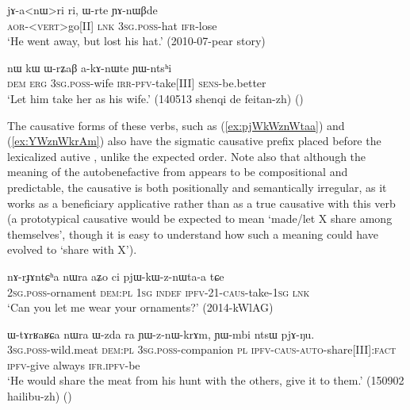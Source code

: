 \begin{exe}
\ex \label{ex:Wrte.YAnWBde2}
\gll jɤ-a<nɯ>ri ri, ɯ-rte ɲɤ-nɯβde \\
\textsc{aor}-<\textsc{vert}>go[II] \textsc{lnk} \textsc{3sg}.\textsc{poss}-hat \textsc{ifr}-lose\\
\glt `He went away, but lost his hat.' (2010-07-pear story)
\end{exe}

\begin{exe}
\ex \label{ex:WrZaB.akAnWte}
\gll nɯ kɯ ɯ-rʑaβ a-kɤ-nɯte ɲɯ-ntsʰi \\
\textsc{dem} \textsc{erg} \textsc{3sg}.\textsc{poss}-wife \textsc{irr}-\textsc{pfv}-take[III] \textsc{sens}-be.better \\
\glt `Let him take her as his wife.' (140513 shenqi de feitan-zh) ()
\end{exe}

The causative forms of these  verbs, such as   (\ref{ex:pjWkWznWtaa}) and  (\ref{ex:YWznWkrAm}) also have the sigmatic causative prefix placed before the lexicalized autive , unlike the expected order.  Note also that although the meaning of the autobenefactive  from    appears to be compositional and predictable, the causative is both positionally and semantically irregular, as it works as a beneficiary applicative rather than as a true causative with this verb (a prototypical causative would be expected to mean `made/let X share among themselves', though it is easy to understand how such a meaning could have evolved to `share with X').

\begin{exe}
\ex \label{ex:pjWkWznWtaa}
\gll nɤ-rɟɤntɕʰa nɯra aʑo ci pjɯ-kɯ-z-nɯta-a tɕe \\
\textsc{2sg}.\textsc{poss}-ornament \textsc{dem}:\textsc{pl} \textsc{1sg} \textsc{indef} \textsc{ipfv}-2\fl{}1-\textsc{caus}-take-\textsc{1sg} \textsc{lnk} \\
\glt `Can you let me wear your ornaments?' (2014-kWlAG)
\end{exe}

\begin{exe}
\ex \label{ex:YWznWkrAm}
\gll ɯ-tɤrʁaʁɕa nɯra ɯ-zda ra ɲɯ-z-nɯ-krɤm, ɲɯ-mbi ntsɯ pjɤ-ŋu. \\
\textsc{3sg}.\textsc{poss}-wild.meat \textsc{dem}:\textsc{pl} \textsc{3sg}.\textsc{poss}-companion \textsc{pl} \textsc{ipfv}-\textsc{caus}-\textsc{auto}-share[III]:\textsc{fact} \textsc{ipfv}-give always \textsc{ifr}.\textsc{ipfv}-be \\
\glt `He would share the meat from his hunt with the others, give it to them.' (150902 hailibu-zh)
()
\end{exe}

